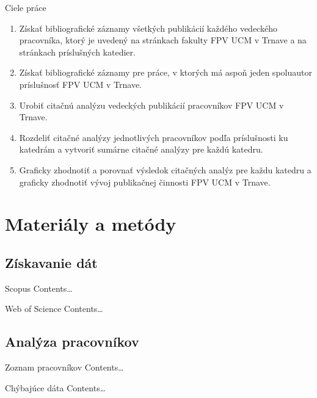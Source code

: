 \documentclass{beamer}
\begin{document}
\begin{frame}{Ciele práce}
  \begin{enumerate}
  \item<1-> Získať bibliografické záznamy všetkých publikácií každého vedeckého
    pracovníka, ktorý je uvedený na stránkach fakulty FPV UCM v Trnave a na
    stránkach príslušných katedier.
  \item<2-> Získať bibliografické záznamy pre práce, v ktorých má aspoň jeden
    spoluautor príslušnosť FPV UCM v Trnave.
  \item<3-> Urobiť citačnú analýzu vedeckých publikácií pracovníkov FPV UCM v
    Trnave.
  \item<4-> Rozdeliť citačné analýzy jednotlivých pracovníkov podľa príslušnosti
    ku katedrám a vytvoriť sumárne citačné analýzy pre každú katedru.
  \item<5-> Graficky zhodnotiť a porovnať výsledok citačných analýz pre každu
    katedru a graficky zhodnotiť vývoj publikačnej činnosti FPV UCM v Trnave.
  \end{enumerate}
\end{frame}


\section{Materiály a metódy}

\subsection{Získavanie dát}

%
%
\begin{frame}{Scopus}
  Contents\dots
\end{frame}

%
%
\begin{frame}{Web of Science}
  Contents\dots
\end{frame}


\subsection{Analýza pracovníkov}

%
%
\begin{frame}{Zoznam pracovníkov}
  Contents\dots
\end{frame}

%
%
\begin{frame}{Chýbajúce dáta}
Contents\dots
\end{frame}
\end{document}

